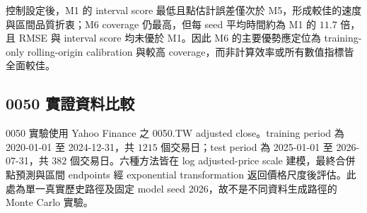 \begin{table}[htbp]
\centering
\caption{M1M9--GARCH 模擬資料：控制超參數之 20 次 Monte Carlo 平均結果}
\label{tab:simulation-controlled}
\end{table}

控制設定後，M1 的 interval score 最低且點估計誤差僅次於 M5，形成較佳的速度與區間品質折衷；M6 coverage 仍最高，但每 seed 平均時間約為 M1 的 $11.7$ 倍，且 RMSE 與 interval score 均未優於 M1。因此 M6 的主要優勢應定位為 training-only rolling-origin calibration 與較高 coverage，而非計算效率或所有數值指標皆全面較佳。

\subsection{0050 實證資料比較}
\label{subsec:0050-results}

0050 實驗使用 Yahoo Finance 之 0050.TW adjusted close。training period 為 2020-01-01 至 2024-12-31，共 $1215$ 個交易日；test period 為 2025-01-01 至 2026-07-31，共 $382$ 個交易日。六種方法皆在 log adjusted-price scale 建模，最終合併點預測與區間 endpoints 經 exponential transformation 返回價格尺度後評估。此處為單一真實歷史路徑及固定 model seed 2026，故不是不同資料生成路徑的 Monte Carlo 實驗。

